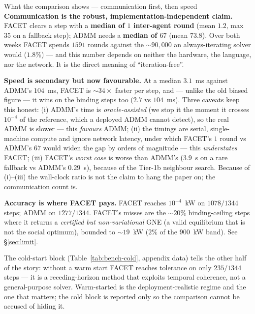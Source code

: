 \documentclass[11pt, letterpaper]{article}
\begin{document}
\begin{keybox}{What the comparison shows --- communication first, then speed}
\textbf{Communication is the robust, implementation-independent claim.} FACET clears a step with a
\textbf{median of $1$ inter-agent round} (mean $1.2$, max $35$ on a fallback step); ADMM needs a
\textbf{median of $67$} (mean $73.8$). Over both weeks FACET spends $1591$ rounds against the
$\sim\!90{,}000$ an always-iterating solver would ($1.8\%$) --- and this number depends on neither
the hardware, the language, nor the network. It is the direct meaning of ``iteration-free''.

\textbf{Speed is secondary but now favourable.} At a median $3.1$~ms against ADMM's $104$~ms, FACET
is $\sim\!34\times$ faster per step, and --- unlike the old biased figure --- it wins on the binding
steps too ($2.7$ vs $104$~ms). Three caveats keep this honest: (i) ADMM's time is
\emph{oracle-assisted} (we stop it the moment it crosses $10^{-4}$ of the reference, which a deployed
ADMM cannot detect), so the real ADMM is slower --- this \emph{favours} ADMM; (ii) the timings are
serial, single-machine compute and ignore network latency, under which FACET's $1$ round vs ADMM's
$67$ would widen the gap by orders of magnitude --- this \emph{understates} FACET; (iii) FACET's
\emph{worst case} is worse than ADMM's ($3.9$~s on a rare fallback vs ADMM's $0.29$~s), because of
the Tier-1b neighbour search. Because of (i)--(iii) the wall-clock ratio is not the claim to hang the
paper on; the communication count is.

\textbf{Accuracy is where FACET pays.} FACET reaches $10^{-4}$~kW on $1078/1344$ steps; ADMM on
$1277/1344$. FACET's misses are the $\sim\!20\%$ binding-ceiling steps where it returns a
\emph{certified but non-variational} GNE (a valid equilibrium that is not the social optimum),
bounded to $\sim\!19$~kW ($2\%$ of the $900$~kW band). See \S\ref{sec:limit}.
\end{keybox}

The cold-start block (Table~\ref{tab:bench-cold}, appendix data) tells the other half of the story:
without a warm start FACET reaches tolerance on only $235/1344$ steps --- it is a receding-horizon
method that exploits temporal coherence, not a general-purpose solver. Warm-started is the
deployment-realistic regime and the one that matters; the cold block is reported only so the
comparison cannot be accused of hiding it.


\end{document}
